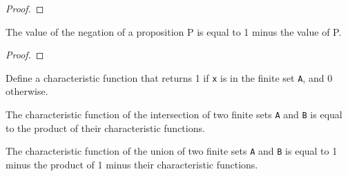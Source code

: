 \begin{proof}
  \leanok
\end{proof}

\begin{lemma}\label{toInt_not}
  \leanok
  The value of the negation of a proposition P is equal to 1 minus the value of P.
\end{lemma}

\begin{proof}
  \leanok
\end{proof}

\begin{definition}\label{char_fun}
  \leanok
  Define a characteristic function that returns 1 if \verb|x| is in the finite set \verb|A|, and 0 otherwise.
\end{definition}

\begin{lemma}\label{char_fun_inter}
  The characteristic function of the intersection of two finite sets \verb|A| and \verb|B| is equal to the product of their characteristic functions.
\end{lemma}

\begin{lemma}\label{char_fun_union}
  The characteristic function of the union of two finite sets \verb|A| and \verb|B| is equal to 1 minus the product of 1 minus their characteristic functions.
\end{lemma}

